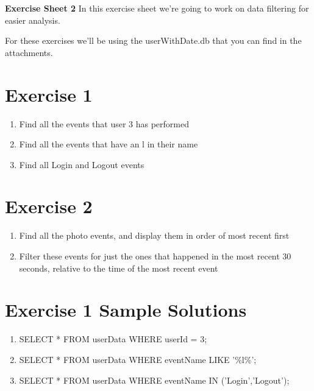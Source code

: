 \documentclass[USenglish,final,authoryear,12pt]{article}
\begin{document}
\textbf{\LARGE Exercise Sheet 2}\newline
In this exercise sheet we're going to work on data filtering for easier analysis.\newline

For these exercises we'll be using the userWithDate.db that you can find in the attachments.
\section{Exercise 1}
\begin{enumerate}
	\item Find all the events that user 3 has performed
	\item Find all the events that have an l in their name
	\item Find all Login and Logout events
\end{enumerate}

\section{Exercise 2}

\begin{enumerate}
	\item Find all the photo events, and display them in order of most recent first
	\item Filter these events for just the ones that happened in the most recent 30 seconds, relative to the time of the most recent event
\end{enumerate}
\pagebreak

\section{Exercise 1 Sample Solutions}
\begin{enumerate}
	\item SELECT *\newline
	FROM userData\newline
	WHERE userId = 3;
	\item SELECT *\newline
	FROM userData\newline
	WHERE eventName LIKE '\%l\%';
	\item SELECT *\newline
	FROM userData\newline
	WHERE eventName IN ('Login','Logout');
\end{enumerate}
\end{document}
